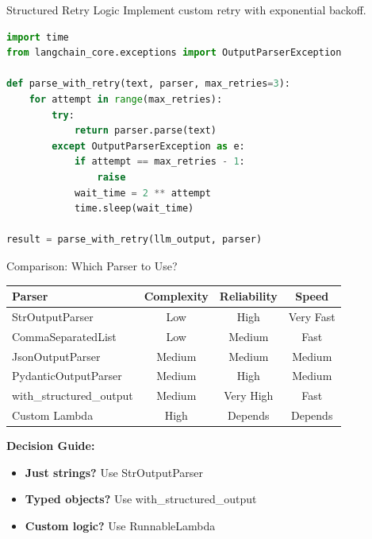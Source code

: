 \documentclass[aspectratio=169,11pt]{beamer}
\begin{document}
\begin{frame}[fragile]{Structured Retry Logic}
Implement custom retry with exponential backoff.

\begin{lstlisting}[language=Python]
import time
from langchain_core.exceptions import OutputParserException

def parse_with_retry(text, parser, max_retries=3):
    for attempt in range(max_retries):
        try:
            return parser.parse(text)
        except OutputParserException as e:
            if attempt == max_retries - 1:
                raise
            wait_time = 2 ** attempt
            time.sleep(wait_time)

result = parse_with_retry(llm_output, parser)
\end{lstlisting}
\end{frame}

\begin{frame}{Comparison: Which Parser to Use?}
\small
\begin{center}
\begin{tabular}{|l|c|c|c|}
\hline
\textbf{Parser} & \textbf{Complexity} & \textbf{Reliability} & \textbf{Speed} \\
\hline
StrOutputParser & Low & High & Very Fast \\
\hline
CommaSeparatedList & Low & Medium & Fast \\
\hline
JsonOutputParser & Medium & Medium & Medium \\
\hline
PydanticOutputParser & Medium & High & Medium \\
\hline
with\_structured\_output & Medium & Very High & Fast \\
\hline
Custom Lambda & High & Depends & Depends \\
\hline
\end{tabular}
\end{center}

\vspace{0.08cm}

\textbf{Decision Guide:}
\begin{itemize}
  \setlength{\itemsep}{1pt}
  \item \textbf{Just strings?} Use StrOutputParser
  \item \textbf{Typed objects?} Use with\_structured\_output
  \item \textbf{Custom logic?} Use RunnableLambda
\end{itemize}
\end{frame}
\end{document}

